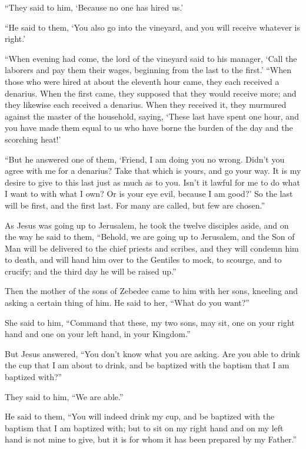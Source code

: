  ``They said to him, `Because no one has hired us.'

``He said to them, `You also go into the vineyard, and you will receive
whatever is right.'

 ``When evening had come, the lord of the vineyard said to
his manager, `Call the laborers and pay them their wages, beginning from
the last to the first.'  ``When those who were hired at
about the eleventh hour came, they each received a denarius.
 When the first came, they supposed that they would
receive more; and they likewise each received a denarius.
 When they received it, they murmured against the master
of the household,  saying, `These last have spent one
hour, and you have made them equal to us who have borne the burden of
the day and the scorching heat!'

 ``But he answered one of them, `Friend, I am doing you
no wrong. Didn't you agree with me for a denarius?  Take
that which is yours, and go your way. It is my desire to give to this
last just as much as to you.  Isn't it lawful for me to
do what I want to with what I own? Or is your eye evil, because I am
good?'  So the last will be first, and the first last.
For many are called, but few are chosen.''

 As Jesus was going up to Jerusalem, he took the twelve
disciples aside, and on the way he said to them, 
``Behold, we are going up to Jerusalem, and the Son of Man will be
delivered to the chief priests and scribes, and they will condemn him to
death,  and will hand him over to the Gentiles to mock,
to scourge, and to crucify; and the third day he will be raised up.''

 Then the mother of the sons of Zebedee came to him with
her sons, kneeling and asking a certain thing of him.  He
said to her, ``What do you want?''

She said to him, ``Command that these, my two sons, may sit, one on your
right hand and one on your left hand, in your Kingdom.''

 But Jesus answered, ``You don't know what you are
asking. Are you able to drink the cup that I am about to drink, and be
baptized with the baptism that I am baptized with?''

They said to him, ``We are able.''

 He said to them, ``You will indeed drink my cup, and be
baptized with the baptism that I am baptized with; but to sit on my
right hand and on my left hand is not mine to give, but it is for whom
it has been prepared by my Father.''

